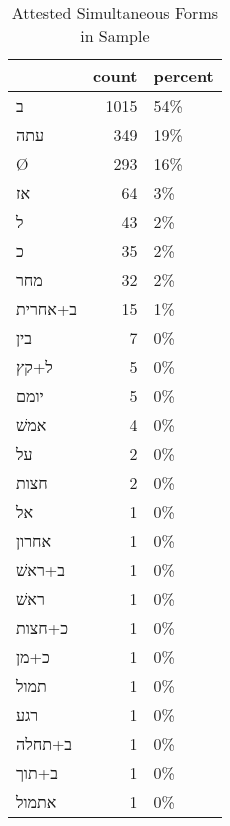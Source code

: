 \begin{table}[htbp!]
\centering
\caption{Attested Simultaneous Forms in Sample}
\label{table:sim_front}
\begin{tabular}{lrl}
\toprule
{} &  count & percent \\
\midrule
\texthebrew{ב}       &   1015 &     54\% \\
\texthebrew{עתה}     &    349 &     19\% \\
\texthebrew{Ø}       &    293 &     16\% \\
\texthebrew{אז}      &     64 &      3\% \\
\texthebrew{ל}       &     43 &      2\% \\
\texthebrew{כ}       &     35 &      2\% \\
\texthebrew{מחר}     &     32 &      2\% \\
\texthebrew{ב+אחרית} &     15 &      1\% \\
\texthebrew{בין}     &      7 &      0\% \\
\texthebrew{ל+קץ}    &      5 &      0\% \\
\texthebrew{יומם}    &      5 &      0\% \\
\texthebrew{אמשׁ}    &      4 &      0\% \\
\texthebrew{על}      &      2 &      0\% \\
\texthebrew{חצות}    &      2 &      0\% \\
\texthebrew{אל}      &      1 &      0\% \\
\texthebrew{אחרון}   &      1 &      0\% \\
\texthebrew{ב+ראשׁ}  &      1 &      0\% \\
\texthebrew{ראשׁ}    &      1 &      0\% \\
\texthebrew{כ+חצות}  &      1 &      0\% \\
\texthebrew{כ+מן}    &      1 &      0\% \\
\texthebrew{תמול}    &      1 &      0\% \\
\texthebrew{רגע}     &      1 &      0\% \\
\texthebrew{ב+תחלה}  &      1 &      0\% \\
\texthebrew{ב+תוך}   &      1 &      0\% \\
\texthebrew{אתמול}   &      1 &      0\% \\
\bottomrule
\end{tabular}
\end{table}
